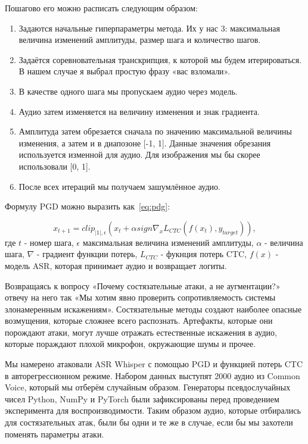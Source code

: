 Пошагово его можно расписать следующим образом:
\begin{enumerate}
  \item Задаются начальные гиперпараметры метода.
  Их у нас 3: максимальная величина изменений амплитуды, размер шага и количество шагов.
  \item Задаётся соревновательная транскрипция, к которой мы будем итерироваться.
  В нашем случае я выбрал простую фразу «вас взломали».
  \item В качестве одного шага мы пропускаем аудио через модель.
  \item Аудио затем изменяется на величину изменения и знак градиента.
  \item Амплитуда затем обрезается сначала по значению максимальной величины изменения, а затем и в диапозоне [-1, 1].
  Данные значения обрезания используется изменной для аудио.
  Для изображения мы бы скорее использовали [0, 1].
  \item После всех итераций мы получаем зашумлённое аудио.
\end{enumerate}

Формулу PGD можно выразить как~\ref{eq:pdg}:

\begin{equation}
  x_{t+1} = clip_{|1|, \epsilon}(x_t + \alpha sign \nabla_x L_{CTC}(f(x_t), y_{target})),
  \label{eq:pdg}
\end{equation}
где $t$ - номер шага, $\epsilon$ максимальная величина изменений амплитуды, $\alpha$ - величина шага, $\nabla$ - градиент функции потерь, $L_{CTC}$ - фукнция потерь CTC, $f(x)$ - модель ASR, которая принимает аудио и возвращает логиты.

Возвращаясь к вопросу «Почему состязательные атаки, а не аугментации?» отвечу на него так «Мы хотим явно проверить сопротивляемость системы злонамеренным искажениям».
Состязательные методы создают наиболее опасные возмущения, которые сложнее всего распознать.
Артефакты, которые они порождают атаки, могут лучше отражать естественные искажения в аудио, которые пораждают плохой микрофон, окружающие шумы и прочее\cite{engstrom2019adversarial}.

Мы намерено атаковали ASR Whisper с помощью PGD и функцией потерь CTC в авторегрессионном режиме.
Набором данных выступят 2000 аудио из Common Voice, который мы отберём случайным образом.
Генераторы псевдослучайных чисел Python, NumPy и PyTorch были зафиксированы перед проведением эксперимента для воспроизводимости.
Таким образом аудио, которые отбирались для состязательных атак, были бы одни и те же в случае, если бы мы захотели поменять параметры атаки.

